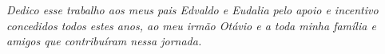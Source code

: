 \begin{dedicatoria}
   \vspace*{\fill}
   \centering
   \noindent
   \textit{Dedico esse trabalho aos meus pais Edvaldo e Eudalia pelo apoio e incentivo concedidos todos estes anos, ao meu irmão Otávio e a toda minha família e amigos que contribuíram nessa jornada.} \vspace*{\fill}
\end{dedicatoria}
